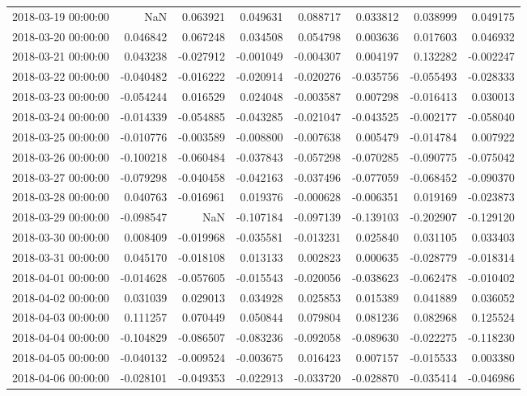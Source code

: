\begin{tabular}{lrrrrrrr}
2018-03-19 00:00:00 & NaN & 0.063921 & 0.049631 & 0.088717 & 0.033812 & 0.038999 & 0.049175 \\
2018-03-20 00:00:00 & 0.046842 & 0.067248 & 0.034508 & 0.054798 & 0.003636 & 0.017603 & 0.046932 \\
2018-03-21 00:00:00 & 0.043238 & -0.027912 & -0.001049 & -0.004307 & 0.004197 & 0.132282 & -0.002247 \\
2018-03-22 00:00:00 & -0.040482 & -0.016222 & -0.020914 & -0.020276 & -0.035756 & -0.055493 & -0.028333 \\
2018-03-23 00:00:00 & -0.054244 & 0.016529 & 0.024048 & -0.003587 & 0.007298 & -0.016413 & 0.030013 \\
2018-03-24 00:00:00 & -0.014339 & -0.054885 & -0.043285 & -0.021047 & -0.043525 & -0.002177 & -0.058040 \\
2018-03-25 00:00:00 & -0.010776 & -0.003589 & -0.008800 & -0.007638 & 0.005479 & -0.014784 & 0.007922 \\
2018-03-26 00:00:00 & -0.100218 & -0.060484 & -0.037843 & -0.057298 & -0.070285 & -0.090775 & -0.075042 \\
2018-03-27 00:00:00 & -0.079298 & -0.040458 & -0.042163 & -0.037496 & -0.077059 & -0.068452 & -0.090370 \\
2018-03-28 00:00:00 & 0.040763 & -0.016961 & 0.019376 & -0.000628 & -0.006351 & 0.019169 & -0.023873 \\
2018-03-29 00:00:00 & -0.098547 & NaN & -0.107184 & -0.097139 & -0.139103 & -0.202907 & -0.129120 \\
2018-03-30 00:00:00 & 0.008409 & -0.019968 & -0.035581 & -0.013231 & 0.025840 & 0.031105 & 0.033403 \\
2018-03-31 00:00:00 & 0.045170 & -0.018108 & 0.013133 & 0.002823 & 0.000635 & -0.028779 & -0.018314 \\
2018-04-01 00:00:00 & -0.014628 & -0.057605 & -0.015543 & -0.020056 & -0.038623 & -0.062478 & -0.010402 \\
2018-04-02 00:00:00 & 0.031039 & 0.029013 & 0.034928 & 0.025853 & 0.015389 & 0.041889 & 0.036052 \\
2018-04-03 00:00:00 & 0.111257 & 0.070449 & 0.050844 & 0.079804 & 0.081236 & 0.082968 & 0.125524 \\
2018-04-04 00:00:00 & -0.104829 & -0.086507 & -0.083236 & -0.092058 & -0.089630 & -0.022275 & -0.118230 \\
2018-04-05 00:00:00 & -0.040132 & -0.009524 & -0.003675 & 0.016423 & 0.007157 & -0.015533 & 0.003380 \\
2018-04-06 00:00:00 & -0.028101 & -0.049353 & -0.022913 & -0.033720 & -0.028870 & -0.035414 & -0.046986 \\

\end{tabular}

